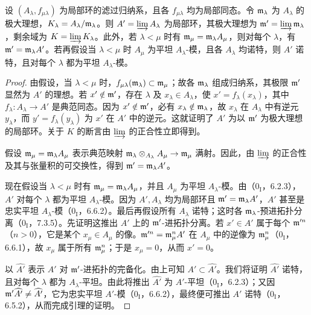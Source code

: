 设 $(A_\lambda,f_{\mu\lambda})$ 为局部环的滤过归纳系，且各 $f_{\mu\lambda}$ 均为局部同态。令 $\mathfrak m_\lambda$ 为 $A_\lambda$ 的极大理想，$K_\lambda=A_\lambda/\mathfrak m_\lambda$。则 $A'=\varinjlim A_\lambda$ 为局部环，其极大理想为 $\mathfrak m'=\varinjlim\mathfrak m_\lambda$，剩余域为 $K=\varinjlim K_\lambda$。此外，若 $\lambda<\mu$ 时有 $\mathfrak m_\mu=\mathfrak m_\lambda A_\mu$，则对每个 $\lambda$，有 $\mathfrak m'=\mathfrak m_\lambda A'$。若再假设当 $\lambda<\mu$ 时 $A_\mu$ 为平坦 $A_\lambda$-模，且各 $A_\lambda$ 均诺特，则 $A'$ 诺特，且对每个 $\lambda$ 都为平坦 $A_\lambda$-模。
\begin{proof}
由假设，当 $\lambda<\mu$ 时，$f_{\mu\lambda}(\mathfrak m_\lambda)\subset\mathfrak m_\mu$；故各 $\mathfrak m_\lambda$ 组成归纳系，其极限 $\mathfrak m'$ 显然为 $A'$ 的理想。若 $x'\notin\mathfrak m'$，存在 $\lambda$ 及 $x_\lambda\in A_\lambda$，使 $x'=f_\lambda(x_\lambda)$，其中 $f_\lambda:A_\lambda\to A'$ 是典范同态。因为 $x'\notin\mathfrak m'$，必有 $x_\lambda\notin\mathfrak m_\lambda$，故 $x_\lambda$ 在 $A_\lambda$ 中有逆元 $y_\lambda$，而 $y'=f_\lambda(y_\lambda)$ 为 $x'$ 在 $A'$ 中的逆元。这就证明了 $A'$ 为以 $\mathfrak m'$ 为极大理想的局部环。关于 $K$ 的断言由 $\varinjlim$ 的正合性立即得到。

假设 $\mathfrak m_\mu=\mathfrak m_\lambda A_\mu$ 表示典范映射 $\mathfrak m_\lambda\otimes_{A_\lambda}A_\mu\to\mathfrak m_\mu$ 满射。因此，由 $\varinjlim$ 的正合性及其与张量积的可交换性，得到 $\mathfrak m'=\mathfrak m_\lambda A'$。

现在假设当 $\lambda<\mu$ 时有 $\mathfrak m_\mu=\mathfrak m_\lambda A_\mu$，并且 $A_\mu$ 为平坦 $A_\lambda$-模。由（$0_{\mathrm I}$，6.2.3），$A'$ 对每个 $\lambda$ 都为平坦 $A_\lambda$-模。因为 $A',A_\lambda$ 均为局部环且 $\mathfrak m'=\mathfrak m_\lambda A'$，$A'$ 甚至是忠实平坦 $A_\lambda$-模（$0_{\mathrm I}$，6.6.2）。最后再假设所有 $A_\lambda$ 诺特；这时各 $\mathfrak m_\lambda$-预进拓扑分离（$0_{\mathrm I}$，7.3.5）。先证明这推出 $A'$ 上的 $\mathfrak m'$-进拓扑分离。若 $x'\in A'$ 属于每个 $\mathfrak m'^n$（$n>0$），它是某个 $x_\mu\in A_\mu$ 的像。$\mathfrak m'^n=\mathfrak m_\mu^nA'$ 在 $A_\mu$ 中的逆像为 $\mathfrak m_\mu^n$（$0_{\mathrm I}$，6.6.1），故 $x_\mu$ 属于所有 $\mathfrak m_\mu^n$；于是 $x_\mu=0$，从而 $x'=0$。

以 $\widehat{A'}$ 表示 $A'$ 对 $\mathfrak m'$-进拓扑的完备化。由上可知 $A'\subset\widehat{A'}$。我们将证明 $\widehat{A'}$ 诺特，且对每个 $\lambda$ 都为 $A_\lambda$-平坦。由此将推出 $\widehat{A'}$ 为 $A'$-平坦（$0_{\mathrm I}$，6.2.3）；又因 $\mathfrak m'\widehat{A'}\ne\widehat{A'}$，它为忠实平坦 $A'$-模（$0_{\mathrm I}$，6.6.2），最终便可推出 $A'$ 诺特（$0_{\mathrm I}$，6.5.2），从而完成引理的证明。


\end{proof}
